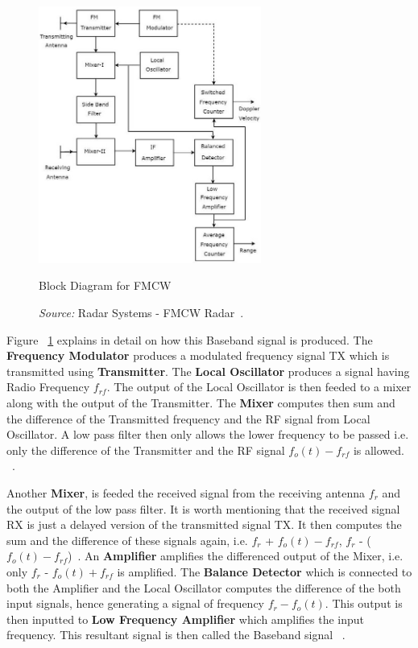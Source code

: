  \begin{figure}[ht]
  \begin{center}
    \includegraphics[width=0.650\textwidth]{Master's thesis/images/fmcw_working.jpg} 
    \caption{Block Diagram for FMCW}
    \caption*{\textit{Source:} Radar Systems - FMCW Radar~\cite{tutorialspoint}.}
    \label{fig:fmcw}
  \end{center}
\end{figure}   

Figure ~\ref{fig:fmcw} explains in detail on how this Baseband signal is produced. 
The \textbf{Frequency Modulator} produces a modulated frequency signal TX which is transmitted using \textbf{Transmitter}. The \textbf{Local Oscillator} produces a signal having Radio Frequency \(f_{rf}\). The output of the Local Oscillator is then feeded to a mixer along with the output of the Transmitter. The \textbf{Mixer} computes then sum and the difference of the Transmitted frequency and the RF signal from Local Oscillator. A low pass filter then only allows the lower frequency to be passed i.e. only the difference of the Transmitter and the RF signal \(f_o(t) - f_{rf}\) is allowed. ~\cite{tutorialspoint}. 

Another \textbf{Mixer}, is feeded the received signal from the receiving antenna \(f_r\) and the output of the low pass filter. It is worth mentioning that the received signal RX is just a delayed version of the transmitted signal TX. It then computes the sum and the difference of these signals again, i.e. \(f_r\) + \(f_o(t) - f_{rf}\), \(f_r\) - (\(f_o(t) - f_{rf}\))~\cite{tutorialspoint}. An \textbf{Amplifier} amplifies the differenced output of the Mixer, i.e. only \(f_r\) - \(f_o(t) + f_{rf}\) is amplified. The \textbf{Balance Detector} which is connected to both the Amplifier and the Local Oscillator computes the difference of the both input signals, hence generating a signal of frequency \(f_r - f_o(t)\). 
This output is then inputted to \textbf{Low Frequency Amplifier} which amplifies the input frequency. This resultant signal is then called the Baseband signal ~\cite{tutorialspoint}. 


